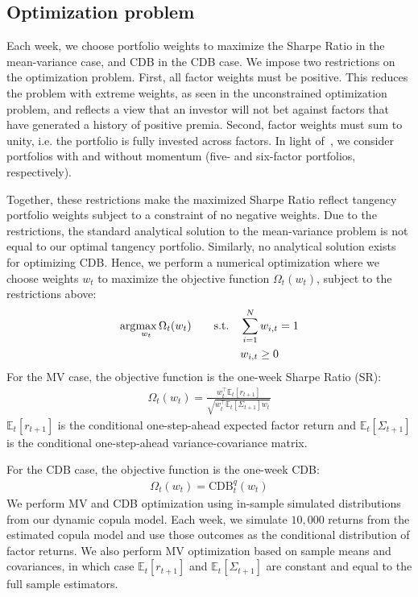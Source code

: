 
\subsection{Optimization problem} %
\label{sub:optimization_problem}

Each week, we choose portfolio weights to maximize the Sharpe Ratio in the mean-variance case, and CDB in the CDB case. We impose two restrictions on the optimization problem. First, all factor weights must be positive. This reduces the problem with extreme weights, as seen in the unconstrained optimization problem, and reflects a view that an investor will not bet against factors that have generated a history of positive premia. Second, factor weights must sum to unity, i.e. the portfolio is fully invested across factors. In light of~\textcite{Asness2015}, we consider portfolios with and without momentum (five- and six-factor portfolios, respectively).

Together, these restrictions make the maximized Sharpe Ratio reflect tangency portfolio weights subject to a constraint of no negative weights. Due to the restrictions, the standard analytical solution to the mean-variance problem is not equal to our optimal tangency portfolio. Similarly, no analytical solution exists for optimizing CDB. Hence, we perform a numerical optimization where we choose weights $w_t$ to maximize the objective function $\Omega_t(w_t)$, subject to the restrictions above:
\begin{align}
  \arg\!\max_{w_t} \Omega_t(w_t)
    &&\text{\quad s.t.\quad} & \sum_{i=1}^N w_{i,t} = 1 \\
    &&                       & w_{i,t} \ge 0 \notag
\end{align}
For the MV case, the objective function is the one-week Sharpe Ratio (SR):
\begin{align}
  \Omega_t(w_t) = \frac{w_t^\top \mathbb{E}_t[r_{t+1}]}{\sqrt{w_t^\top \mathbb{E}_t[\Sigma_{t+1}] w_t}}
\end{align}
$\mathbb{E}_t[r_{t+1}]$ is the conditional one-step-ahead expected factor return and $\mathbb{E}_t[\Sigma_{t+1}]$ is the conditional one-step-ahead variance-covariance matrix. 

For the CDB case, the objective function is the one-week CDB:
\begin{align}
  \Omega_t(w_t) = \text{CDB}_t^q(w_t)
\end{align}
We perform MV and CDB optimization using in-sample simulated distributions from our dynamic copula model. Each week, we simulate $10,000$ returns from the estimated copula model and use those outcomes as the conditional distribution of factor returns. We also perform MV optimization based on sample means and covariances, in which case $\mathbb{E}_t[r_{t+1}]$ and $\mathbb{E}_t[\Sigma_{t+1}]$ are constant and equal to the full sample estimators.


